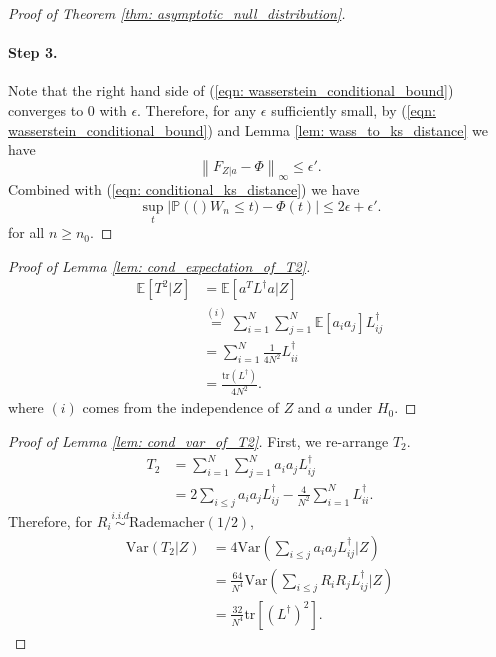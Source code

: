 \documentclass{article}
\newcommand{\Expect}[1]{\mathbb{E}\left[ #1 \right]}
\newcommand{\Var}[1]{\mathrm{Var}\left( #1 \right)}
\newcommand{\Prob}[1]{\mathbb{P}\left( #1 \right)}
\newcommand{\norm}[1]{\left\lVert#1\right\rVert}
\newcommand{\abs}[1]{\left \lvert #1 \right \rvert}
\newcommand{\Linv}{L^{\dagger}}
\newcommand{\tr}{\text{tr}}
\theoremstyle{alden}
\theoremstyle{definition}
\theoremstyle{remark}
\begin{document}
\begin{proof}[Proof of Theorem \ref{thm: asymptotic_null_distribution}]
	\paragraph{Step 3.}
	Note that the right hand side of (\ref{eqn: wasserstein_conditional_bound}) converges to 0 with $\epsilon$. Therefore, for any $\epsilon$ sufficiently small, by (\ref{eqn: wasserstein_conditional_bound}) and Lemma \ref{lem: wass_to_ks_distance} we have
	\begin{equation*}
	\norm{F_{Z | a} - \Phi}_{\infty} \leq \epsilon'.
	\end{equation*}
	Combined with (\ref{eqn: conditional_ks_distance}) we have
	\begin{equation*}
	\sup_{t} \abs{\Prob(W_n \leq t) - \Phi(t)} \leq 2 \epsilon + \epsilon'.
	\end{equation*}
	for all $n \geq n_0$.
	
\end{proof}

\begin{proof}[Proof of Lemma \ref{lem: cond_expectation_of_T2}]
	\begin{align}
	\Expect{T^2 \vert Z} & = \Expect{a^T \Linv a \vert Z} \nonumber \\
	& \overset{(i)}{=} \sum_{i = 1}^{N} \sum_{j = 1}^{N} \Expect{a_i a_j} \Linv_{ij} \nonumber \\
	& =  \sum_{i = 1}^{N} \frac{1}{4N^2} \Linv_{ii} \nonumber \\
	& = \frac{\tr(\Linv)}{4N^2}.
	\end{align}
	where $(i)$ comes from the independence of $Z$ and $a$ under $H_0$.
\end{proof}

\begin{proof}[Proof of Lemma \ref{lem: cond_var_of_T2}]
	First, we re-arrange $T_2$. 
	\begin{align*}
	T_2 & = \sum_{i = 1}^{N} \sum_{j = 1}^{N} a_i a_j \Linv_{ij} \\
	& = 2 \sum_{i \leq j} a_i a_j \Linv_{ij} - \frac{4}{N^2}\sum_{i = 1}^{N} \Linv_{ii}.
	\end{align*}
	Therefore, for $R_i \overset{i.i.d}{\sim} \text{Rademacher}(1/2)$,
	\begin{align*}
	\Var{T_2 \vert Z} & = 4 \Var{\sum_{i \leq j} a_i a_j \Linv_{ij} | Z} \\
	& = \frac{64}{N^4} \Var{\sum_{i \leq j} R_i R_j \Linv_{ij} \vert Z } \\
	& = \frac{32}{N^4} \tr[(\Linv)^2].
	\end{align*}
\end{proof}
\end{document}

